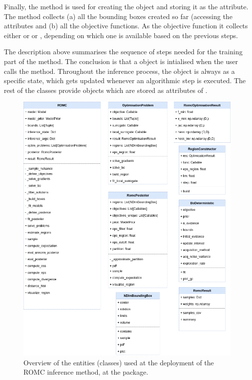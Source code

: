 Finally, the  method is used for creating
the  object and storing it as the
 attribute. The method collects (a) all the
bounding boxes created so far (accessing the
 attributes and (b) all the objective functions. As the objective function it collects either  or  or , depending on which one is available based on the previous steps.

The description above summarises the sequence of steps needed for the
training part of the method. The conclusion is that a 
object is intialised when the user calls the method. Throughout the
inference process, the  object is always as a specific state,
which gets updated whenever an algorithmic step is executed. The rest
of the classes provide objects which are stored as attributes of
.

\begin{figure}[ht]
    \begin{center}
      \includegraphics[width=\textwidth]{./Thesis/graphs/RomcEntityDiagram.png}
    \end{center}
  \caption[Overview of the entities (classes) of the ROMC implementation.]{Overview of the entities (classes) used at the deployment of the ROMC inference method, at the  package.}
  \label{fig:example_training}
\end{figure}


